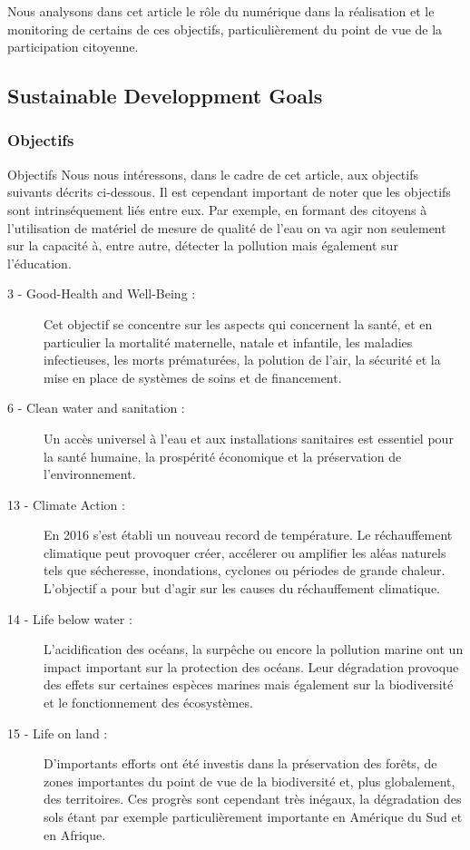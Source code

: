 \documentclass[a4paper,11pt,titlepage]{article}
\begin{document}
		Nous analysons dans cet article le rôle du numérique dans la réalisation et le monitoring de certains de ces objectifs, particulièrement du point de vue de la participation citoyenne.
		 
		\subsection{Sustainable Developpment Goals}
			\subsubsection{Objectifs}
				Objectifs Nous nous intéressons, dans le cadre de cet article, aux objectifs suivants décrits ci-dessous. Il est cependant important de noter que les objectifs sont intrinséquement liés entre eux. Par exemple, en formant des citoyens à l'utilisation de matériel de mesure de qualité de l'eau on va agir non seulement sur la capacité à, entre autre, détecter la pollution mais également sur l'éducation.
				\begin{description}
					\item[ 3 - Good-Health and Well-Being :] Cet objectif se concentre sur les aspects qui	concernent la santé, et en particulier la mortalité maternelle, natale et infantile, les maladies infectieuses, les morts prématurées, la polution de l'air, la sécurité et la mise en place de systèmes de soins et de financement.
					\item[ 6 - Clean water and sanitation :] Un accès universel à l'eau et aux installations sanitaires est essentiel pour la santé humaine, la prospérité économique et la préservation de l'environnement.
					\item[13 - Climate Action :] En 2016 s'est établi un nouveau record de température. Le réchauffement climatique peut provoquer créer, accélerer ou amplifier les aléas	naturels tels que sécheresse, inondations, cyclones ou périodes de grande chaleur. L'objectif a pour but d'agir sur les causes du réchauffement climatique.
					\item[14 - Life below water :] L'acidification des océans, la surpêche ou encore la pollution marine ont un impact important sur la protection des océans. Leur dégradation provoque des effets sur certaines espèces marines mais également sur la biodiversité et le fonctionnement des écosystèmes.
					\item[15 - Life on land :] D'importants efforts ont été investis dans la préservation des forêts, de zones importantes du point de vue de la biodiversité et, plus globalement, des territoires. Ces progrès sont cependant très inégaux, la dégradation des sols étant par exemple particulièrement importante en Amérique du Sud et en Afrique.
				\end{description}
\end{document}
